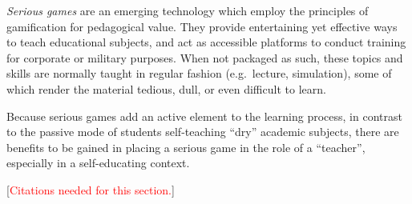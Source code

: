 \documentclass[a4paper]{article}
\newcommand{\comment}[1]{[\textcolor{red}{#1}]} %
\begin{document}
\emph{Serious games} are an emerging technology which employ the principles of gamification for pedagogical value. They provide entertaining yet effective ways to teach educational subjects, and act as accessible platforms to conduct training for corporate or military purposes. When not packaged as such, these topics and skills are normally taught in regular fashion (e.g.\ lecture, simulation), some of which render the material tedious, dull, or even difficult to learn.

Because serious games add an active element to the learning process, in contrast to the passive mode of students self-teaching ``dry'' academic subjects, there are benefits to be gained in placing a serious game in the role of a ``teacher'', especially in a self-educating context.

\comment{Citations needed for this section.}
\end{document}
